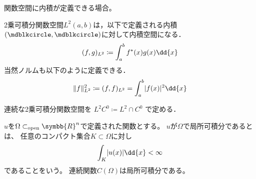 \documentclass[../sotsu.tex]{subfiles}
\begin{document}
関数空間に内積が定義できる場合。

\begin{proposition}
    2乗可積分関数空間$L^2 (a, b)$は，以下で定義される内積$(\bigdot, \bigdot)$に対して内積空間になる．
    \begin{align}
        (f, g)_{L^2} \coloneq \int_a^b \conj{f}(x) g(x) \dd{x}
    \end{align}
    当然ノルムも以下のように定義できる．
    \begin{align}
        \norm{f}_{L^2}^2 \coloneq (f, f)_{L^2} = \int_a^b \abs{f(x)}^2 \dd{x}
    \end{align}
\end{proposition}

\begin{definition}
    連続な2乗可積分関数空間を
    \( L^2 C^0 \coloneq L^2 \cap C^0 \)
    で定める．
\end{definition}


$u$を$\Omega \subset_{\text{open}} \symbb{R}^n$で定義された関数とする。
$u$が$\Omega$で局所可積分であるとは、
任意のコンパクト集合$K \subset \Omega$に対し
\begin{equation*}
    \int_K \abs{ u(x) } \dd{x} < \infty
\end{equation*}
であることをいう。
連続関数$C(\Omega)$は局所可積分である。
\end{document}
